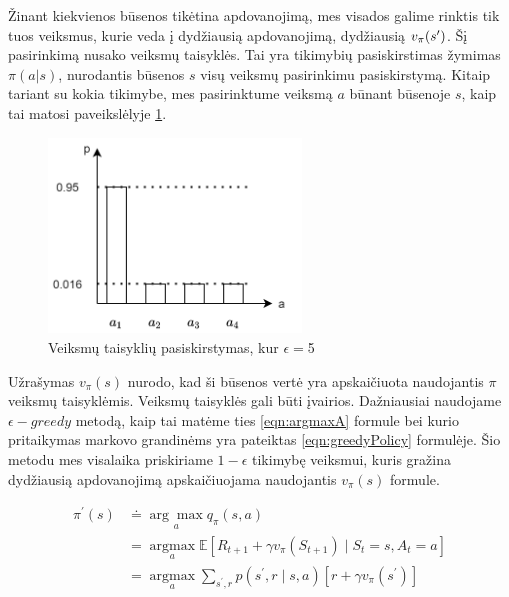 \documentclass[a4paper, 12pt]{article}
\begin{document}
Žinant kiekvienos būsenos tikėtina apdovanojimą, mes visados galime rinktis tik tuos veiksmus, kurie veda į dydžiausią apdovanojimą, dydžiausią $v_\pi(s\sp{\prime})$. Šį pasirinkimą nusako veiksmų taisyklės. Tai yra tikimybių pasiskirstimas žymimas $\pi(a|s)$, nurodantis būsenos $s$ visų veiksmų pasirinkimu pasiskirstymą. Kitaip tariant su kokia tikimybe, mes pasirinktume veiksmą $a$ būnant būsenoje $s$, kaip tai matosi paveikslėlyje \ref{policy}.

\begin{figure}[h]
\centering
\includegraphics[width=0.6\textwidth]{policy}
\caption{Veiksmų taisyklių pasiskirstymas, kur $\epsilon=$5 }
\label{policy}
\end{figure}


Užrašymas $v_{\pi}(s)$ nurodo, kad ši būsenos vertė yra apskaičiuota naudojantis ${\pi}$ veiksmų taisyklėmis. Veiksmų taisyklės gali būti įvairios. Dažniausiai naudojame $\epsilon-greedy$ metodą, kaip tai matėme ties \ref{eqn:argmaxA} formule bei kurio pritaikymas markovo grandinėms yra pateiktas \ref{eqn:greedyPolicy} formulėje. Šio metodu mes visalaika priskiriame $1-\epsilon$ tikimybę veiksmui, kuris gražina dydžiausią apdovanojimą apskaičiuojama naudojantis $v_{\pi}(s)$ formule. 

\begin{equation}
\label{eqn:greedyPolicy}
\begin{aligned}
\pi^{\prime}(s) & \doteq \underset{a}{\arg \max } q_{\pi}(s, a) \\
&=\underset{a}{\operatorname{argmax}} \mathbb{E}\left[R_{t+1}+\gamma v_{\pi}\left(S_{t+1}\right) \mid S_{t}=s, A_{t}=a\right] \\
&=\underset{a}{\operatorname{argmax}} \sum_{s^{\prime}, r} p\left(s^{\prime}, r \mid s, a\right)\left[r+\gamma v_{\pi}\left(s^{\prime}\right)\right]
\end{aligned}
\end{equation}
\end{document}
